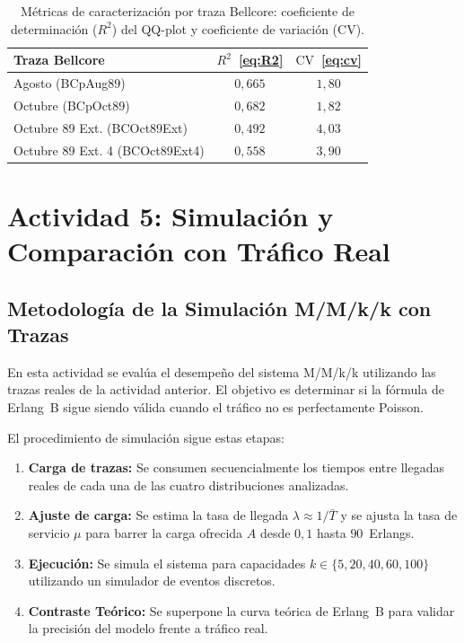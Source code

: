 \documentclass[12pt,a4paper]{article}
\theoremstyle{definition}
\theoremstyle{plain}
\theoremstyle{remark}
\begin{document}
\begin{table}[H]
\centering
\caption{Métricas de caracterización por traza Bellcore: coeficiente de
determinación ($R^2$) del QQ-plot y coeficiente de variación ($\mathrm{CV}$).}
\label{tab:metricas_qq}
\begin{tabular}{lcc}
\toprule
\textbf{Traza Bellcore} & $R^2$~\eqref{eq:R2} & $\mathrm{CV}$~\eqref{eq:cv} \\
\midrule
Agosto (BCpAug89)               & $0{,}665$ & $1{,}80$ \\
Octubre (BCpOct89)              & $0{,}682$ & $1{,}82$ \\
Octubre 89 Ext. (BCOct89Ext)    & $0{,}492$ & $4{,}03$ \\
Octubre 89 Ext. 4 (BCOct89Ext4) & $0{,}558$ & $3{,}90$ \\
\bottomrule
\end{tabular}
\end{table}
\section{Actividad 5: Simulación y Comparación con Tráfico Real}

\subsection*{Metodología de la Simulación M/M/k/k con Trazas}

En esta actividad se evalúa el desempeño del sistema M/M/k/k utilizando las trazas
reales de la actividad anterior. El objetivo es determinar si la fórmula de Erlang~B
sigue siendo válida cuando el tráfico no es perfectamente Poisson.

El procedimiento de simulación sigue estas etapas:

\begin{enumerate}
    \item \textbf{Carga de trazas:} Se consumen secuencialmente los tiempos entre llegadas
          reales de cada una de las cuatro distribuciones analizadas.
    \item \textbf{Ajuste de carga:} Se estima la tasa de llegada $\lambda \approx 1/\bar{T}$
          y se ajusta la tasa de servicio $\mu$ para barrer la carga ofrecida $A$
          desde $0{,}1$ hasta $90$~Erlangs.
    \item \textbf{Ejecución:} Se simula el sistema para capacidades $k \in \{5, 20, 40, 60, 100\}$
          utilizando un simulador de eventos discretos.
    \item \textbf{Contraste Teórico:} Se superpone la curva teórica de Erlang~B para
          validar la precisión del modelo frente a tráfico real.
\end{enumerate}
\end{document}
